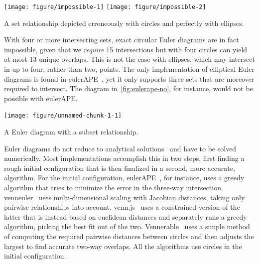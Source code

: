 \documentclass[
  oneside,
  openany,
  numbers=noendperiod,
  parskip=half,
  bibliography=totoc
]{scrbook}\usepackage[]{graphicx}\usepackage{xcolor}
\newenvironment{knitrout}{}{} %
\newcommand{\pkg}[1]{{\fontseries{b}\selectfont #1}}
\begin{document}
\begin{marginfigure}
\begin{knitrout}\small
{}\color{fgcolor}

{\centering \texttt{[image: figure/impossible-1]} 
\texttt{[image: figure/impossible-2]} 

}



\end{knitrout}
\caption{A set relationship depicted erroneously with circles and perfectly with
  ellipses.}
\label{fig:impossible}
\end{marginfigure}

With four or more intersecting sets, exact circular Euler diagrams are in fact
impossible, given that we \emph{require} 15 intersections but with four circles
can yield at most 13 unique overlaps. This is not the case with ellipses, which
may intersect in up to four, rather than two, points. The only implementation of
elliptical Euler diagrams is found in \pkg{eulerAPE}~\citep{Micallef_2014a}, yet
it only supports three sets that are moreover required to intersect. The
diagram in~\cref{fig:eulerape-no}, for instance, would not be possible
with \pkg{eulerAPE}.

\begin{marginfigure}
\begin{knitrout}\small
{}\color{fgcolor}

{\centering \texttt{[image: figure/unnamed-chunk-1-1]} 

}



\end{knitrout}
\caption{A Euler diagram with a subset relationship.}
\label{fig:eulerape-no}
\end{marginfigure}

Euler diagrams do not reduce to analytical solutions~\citep{Chow_2007} and have
to be solved numerically. Most implementations accomplish this in two steps,
first finding a rough initial configuration that is then finalized in a second, more
accurate, algorithm. For the initial configuration,
\pkg{eulerAPE}~\citep{Micallef_2013}, for instance, uses a greedy algorithm that
tries to minimize the error in the three-way intersection.
\pkg{venneuler}~\citep{Wilkinson_2012} uses multi-dimensional scaling with
Jacobian distances, taking only pairwise relationships into account.
\pkg{venn.js}~\citep{Frederickson_2016} uses a constrained version of the latter
that is instead based on euclidean distances and separately runs a greedy
algorithm, picking the best fit out of the two.
\pkg{Vennerable}~\citep{Swinton_2011} uses a simple method of computing the
required pairwise distances between circles and then adjusts the largest to
find accurate two-way overlaps. All the algorithms use
circles in the initial configuration.
\end{document}
